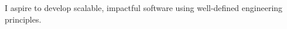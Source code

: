 

\begin{cvparagraph}I aspire to develop scalable, impactful software using well-defined engineering principles.\end{cvparagraph}